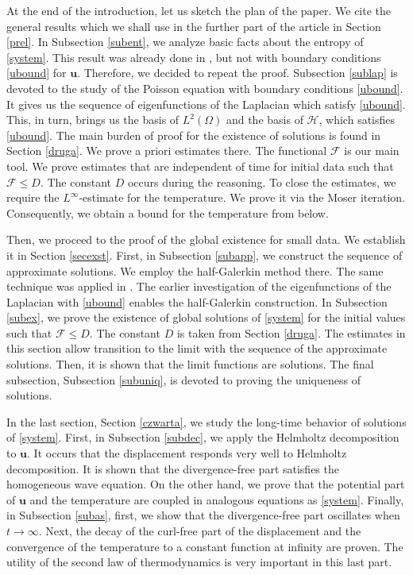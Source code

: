 \documentclass[11pt]{article}
\numberwithin{equation}{section}
\theoremstyle{plain}
\newcommand\bb[1]{\mathbf{#1}}
\newcommand{\ld}{L^2(\Omega)}
\newcommand{\F}{\mathcal{F}}
\newcommand{\bu}{\bb{u}}
\renewcommand{\H}{\mathcal{H}}
\begin{document}
At the end of the introduction, let us sketch the plan of the paper. We cite the general results which we shall use in the further part of the article in Section \ref{prel}. In Subsection \ref{subent}, we analyze basic facts about the entropy of \eqref{system}. This result was already done in \cite{CMT}, but not with boundary conditions \eqref{ubound} for $\bu$. Therefore, we decided to repeat the proof. Subsection \ref{sublap} is devoted to the study of the Poisson equation with boundary conditions \eqref{ubound}. It gives us the sequence of eigenfunctions of the Laplacian which satisfy \eqref{ubound}. This, in turn, brings us the basis of $\ld$ and the basis of $\H$, which satisfies \eqref{ubound}. The main burden of proof for the existence of solutions is found in Section \ref{druga}. We prove a priori estimates there. The functional $\F$ is our main tool. We prove estimates that are independent of time for initial data such that $\F\leq D$. The constant $D$ occurs during the reasoning. To close the estimates, we require the $L^{\infty}$-estimate for the temperature. We prove it via the Moser iteration. Consequently, we obtain a bound for the temperature from below. 

Then, we proceed to the proof of the global existence for small data. We establish it in Section \ref{secexst}. First, in Subsection \ref{subapp}, we construct the sequence of approximate solutions. We employ the half-Galerkin method there. The same technique was applied in \cite{CMT}. The earlier investigation of the eigenfunctions of the Laplacian with \eqref{ubound} enables the half-Galerkin construction. In Subsection \ref{subex}, we prove the existence of global solutions of \eqref{system} for the initial values such that $\F\leq D$. The constant $D$ is taken from Section \ref{druga}. The estimates in this section allow transition to the limit with the sequence of the approximate solutions. Then, it is shown that the limit functions are solutions. The final subsection, Subsection \ref{subuniq}, is devoted to proving the uniqueness of solutions.

In the last section, Section \ref{czwarta}, we study the long-time behavior of solutions of \eqref{system}. First, in Subsection \ref{subdec}, we apply the Helmholtz decomposition to $\bu$. It occurs that the displacement responds very well to Helmholtz decomposition. It is shown that the divergence-free part satisfies the homogeneous wave equation. On the other hand, we prove that the potential part of $\bu$ and the temperature are coupled in analogous equations as \eqref{system}. Finally, in Subsection \ref{subas}, first, we show that the divergence-free part oscillates when $t\to\infty$. Next, the decay of the curl-free part of the displacement and the convergence of the temperature to a constant function at infinity are proven. The utility of the second law of thermodynamics is very important in this last part.
\end{document}
